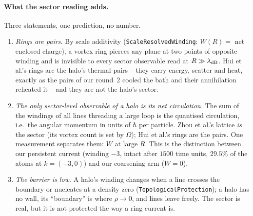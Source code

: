 \documentclass[11pt,a4paper]{article}
\newcommand{\lean}[1]{\texttt{\small #1}}
\begin{document}
\paragraph{What the sector reading adds.} Three statements, one prediction, no number.
\begin{enumerate}[leftmargin=*]
\item \emph{Rings are pairs.} By scale additivity (\lean{ScaleResolvedWinding}: $W(R)=$ net enclosed charge), a
  vortex ring pierces any plane at two points of opposite winding and is invisible to every sector observable
  read at $R\gg\lambda_{\rm dB}$. Hui et al.'s rings are the halo's thermal pairs -- they carry energy, scatter
  and heat, exactly as the pairs of our round~2 cooled the bath and their annihilation reheated it -- and they
  are not the halo's sector.
\item \emph{The only sector-level observable of a halo is its net circulation.} The sum of the windings of all
  lines threading a large loop is the quantised circulation, i.e.\ the angular momentum in units of $\hbar$ per
  particle. Zhou et al.'s lattice \emph{is} the sector (its vortex count is set by $\Omega$); Hui et al.'s rings
  are the pairs. One measurement separates them: $W$ at large $R$. This is the distinction between our
  persistent current (winding $-3$, intact after $1500$ time units, $29.5\%$ of the atoms at $k=(-3,0)$) and our
  coarsening arm ($W=0$).
\item \emph{The barrier is low.} A halo's winding changes when a line crosses the boundary or nucleates at a
  density zero (\lean{TopologicalProtection}); a halo has no wall, its ``boundary'' is where $\rho\to0$, and
  lines leave freely. The sector is real, but it is not protected the way a ring current is.
\end{enumerate}
\end{document}
